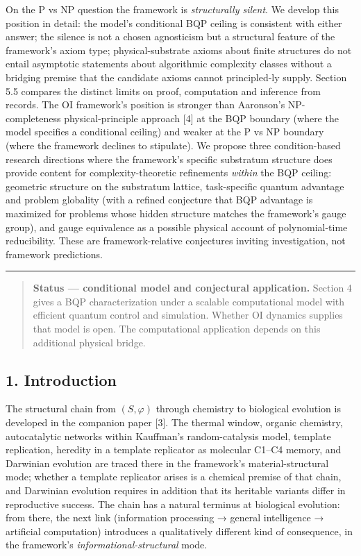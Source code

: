 \documentclass[
]{article}
\begin{document}
On the P vs NP question the framework is \emph{structurally silent}. We
develop this position in detail: the model's conditional BQP ceiling is
consistent with either answer; the silence is not a chosen agnosticism
but a structural feature of the framework's axiom type;
physical-substrate axioms about finite structures do not entail
asymptotic statements about algorithmic complexity classes without a
bridging premise that the candidate axioms cannot principled-ly supply.
Section 5.5 compares the distinct limits on proof, computation and
inference from records. The OI framework's position is stronger than
Aaronson's NP-completeness physical-principle approach {[}4{]} at the
BQP boundary (where the model specifies a conditional ceiling) and
weaker at the P vs NP boundary (where the framework declines to
stipulate). We propose three condition-based research directions where
the framework's specific substratum structure does provide content for
complexity-theoretic refinements \emph{within} the BQP ceiling:
geometric structure on the substratum lattice, task-specific quantum
advantage and problem globality (with a refined conjecture that BQP
advantage is maximized for problems whose hidden structure matches the
framework's gauge group), and gauge equivalence as a possible physical
account of polynomial-time reducibility. These are framework-relative
conjectures inviting investigation, not framework predictions.

\begin{center}\rule{0.5\linewidth}{0.5pt}\end{center}

\begin{quote}
\textbf{Status --- conditional model and conjectural application.}
Section 4 gives a BQP characterization under a scalable computational
model with efficient quantum control and simulation. Whether OI dynamics
supplies that model is open. The computational application depends on
this additional physical bridge.
\end{quote}

\hypertarget{introduction}{%
\subsection{1. Introduction}\label{introduction}}

The structural chain from \((S, \varphi)\) through chemistry to
biological evolution is developed in the companion paper {[}3{]}. The
thermal window, organic chemistry, autocatalytic networks within
Kauffman's random-catalysis model, template replication, heredity in a
template replicator as molecular C1--C4 memory, and Darwinian evolution
are traced there in the framework's material-structural mode; whether a
template replicator arises is a chemical premise of that chain, and
Darwinian evolution requires in addition that its heritable variants
differ in reproductive success. The chain has a natural terminus at
biological evolution: from there, the next link (information processing
→ general intelligence → artificial computation) introduces a
qualitatively different kind of consequence, in the framework's
\emph{informational-structural} mode.
\end{document}
